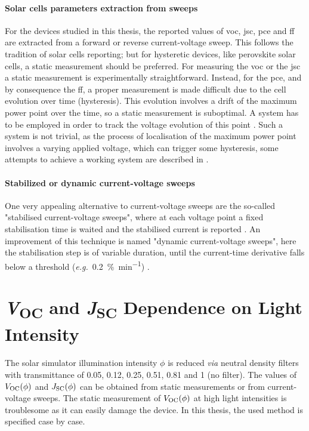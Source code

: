 	\paragraph{Solar cells parameters extraction from sweeps}\label{characterization_hysteresis}
	For the devices studied in this thesis, the reported values of \gls{voc}, \gls{jsc}, \gls{pce} and \gls{ff} are extracted from a forward or reverse current-voltage sweep.
	This follows the tradition of solar cells reporting; but for hysteretic devices, like perovskite solar cells, a static measurement should be preferred.
	For measuring the \gls{voc} or the \gls{jsc} a static measurement is experimentally straightforward.
	Instead, for the \gls{pce}, and by consequence the \gls{ff}, a proper measurement is made difficult due to the cell evolution over time (hysteresis).
	This evolution involves a drift of the maximum power point over the time, so a static measurement is suboptimal.
	A  system has to be employed in order to track the voltage evolution of this point \cite{Zimmermann2016}.
	Such a system is not trivial, as the process of localisation of the maximum power point involves a varying applied voltage, which can trigger some hysteresis, some attempts to achieve a working  system are described in .

	\paragraph{Stabilized or dynamic current-voltage sweeps}
	One very appealing alternative to current-voltage sweeps are the so-called "stabilised current-voltage sweeps", where at each voltage point a fixed stabilisation time is waited and the stabilised current is reported \cite{Unger2014, Christoforo2015, Christians2015}.
	An improvement of this technique is named "dynamic current-voltage sweeps", here the stabilisation step is of variable duration, until the current\hyp{}time derivative falls below a threshold (\textsl{e.g.}\ \SI{0.2}{\%\per\minute}) \cite{Dunbar2017,Dunbar2017a}.


\section{\textit{V}\textsubscript{OC} and \textit{J}\textsubscript{SC} Dependence on Light Intensity}
	The solar simulator illumination intensity $\phi$ is reduced \textsl{via} neutral density filters with transmittance of 0.05, 0.12, 0.25, 0.51, 0.81 and 1 (no filter).
	The values of $V_\mathrm{OC}(\phi)$ and $J_\mathrm{SC}(\phi)$ can be obtained from static measurements or from current-voltage sweeps.
	The static measurement of $V_\mathrm{OC}(\phi)$ at high light intensities is troublesome as it can easily damage the device.
	In this thesis, the used method is specified case by case.

